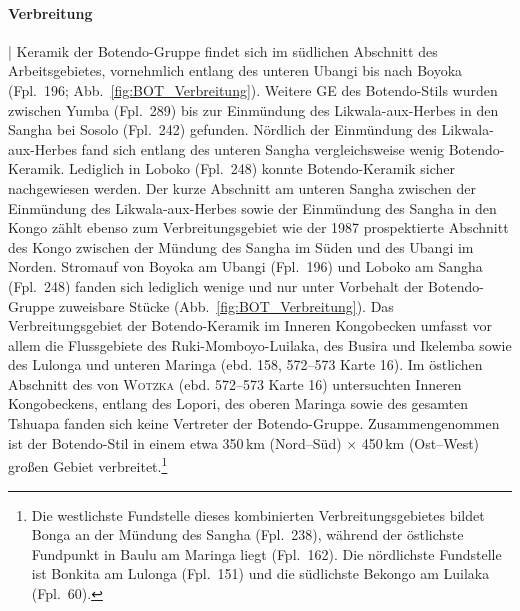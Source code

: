 \paragraph{Verbreitung}\hspace{-.5em}|\hspace{.5em}%
Keramik der Botendo-Gruppe findet sich im südlichen Abschnitt des Arbeitsgebietes, vornehmlich entlang des unteren \mbox{Ubangi} bis nach Boyoka (Fpl.~196; Abb.~\ref{fig:BOT_Verbreitung}). Weitere GE des Botendo-Stils wurden zwischen Yumba (Fpl.~289) bis zur Einmündung des \mbox{Likwala}-\mbox{aux}-\mbox{Herbes} in den \mbox{Sangha} bei Sosolo (Fpl.~242) gefunden. Nördlich der Einmündung des \mbox{Likwala}-\mbox{aux}-\mbox{Herbes} fand sich entlang des unteren \mbox{Sangha} vergleichsweise wenig Botendo-Keramik. Lediglich in Loboko (Fpl.~248) konnte Botendo-Keramik sicher nachgewiesen werden. Der kurze Abschnitt am unteren \mbox{Sangha} zwischen der Einmündung des \mbox{Likwala}-\mbox{aux}-\mbox{Herbes} sowie der Einmündung des \mbox{Sangha} in den Kongo zählt ebenso zum Verbreitungsgebiet wie der 1987 prospektierte Abschnitt des Kongo zwischen der Mündung des \mbox{Sangha} im Süden und des \mbox{Ubangi} im Norden. Stromauf von Boyoka am \mbox{Ubangi} (Fpl.~196) und Loboko am \mbox{Sangha} (Fpl.~248) fanden sich lediglich wenige und nur unter Vorbehalt der Botendo-Gruppe zuweisbare Stücke (Abb.~\ref{fig:BOT_Verbreitung}). Das Verbreitungsgebiet der Botendo-Keramik im Inneren Kongobecken umfasst vor allem die Flussgebiete des Ruki-Momboyo-Luilaka, des Busira und Ikelemba sowie des Lulonga und unteren Maringa (ebd. 158, 572--573 Karte 16). Im östlichen Abschnitt des von \textsc{Wotzka} (ebd. 572--573 Karte 16) untersuchten Inneren Kongobeckens, entlang des Lopori, des oberen Maringa sowie des gesamten Tshuapa fanden sich keine Vertreter der Botendo-Gruppe. Zusammengenommen ist der Botendo-Stil in einem etwa 350\,km (Nord--Süd) $\times$ 450\,km (Ost--West) großen Gebiet verbreitet.\footnote{Die westlichste Fundstelle dieses kombinierten Verbreitungsgebietes bildet Bonga an der Mündung des \mbox{Sangha} (Fpl.~238), während der östlichste Fundpunkt in Baulu am Maringa liegt (Fpl.~162). Die nördlichste Fundstelle ist Bonkita am Lulonga (Fpl.~151) und die südlichste Bekongo am Luilaka (Fpl.~60).}